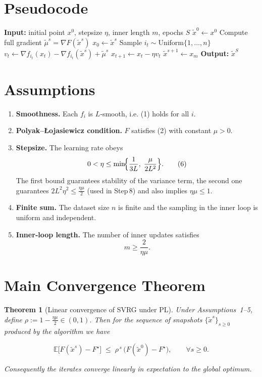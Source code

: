 \documentclass{article}
\newtheorem{theorem}{Theorem}
\newcommand{\E}{\mathbb{E}}
\begin{document}
\section*{Pseudocode}
\begin{algorithm}[H]
\caption{SVRG with PL condition}
\begin{algorithmic}[1]
\State \textbf{Input:} initial point $x^{0}$, stepsize $\eta$, inner length $m$, epochs $S$
\State $\tilde{x}^{0}\gets x^{0}$
    \State Compute full gradient $\tilde{\mu}^{s}= \nabla F(\tilde{x}^{s})$
    \State $x_{0}\gets \tilde{x}^{s}$
        \State Sample $i_t\sim\text{Uniform}\{1,\dots,n\}$
        \State $v_t \gets \nabla f_{i_t}(x_t)-\nabla f_{i_t}(\tilde{x}^{s})+\tilde{\mu}^{s}$
        \State $x_{t+1}\gets x_t-\eta v_t$
    \EndFor
    \State $\tilde{x}^{s+1}\gets x_m$
\EndFor
\State \textbf{Output:} $\tilde{x}^{S}$
\end{algorithmic}
\end{algorithm}

\section*{Assumptions}
\begin{enumerate}
\item \textbf{Smoothness.} Each $f_i$ is $L$‑smooth, i.e. (1) holds for all $i$.
\item \textbf{Polyak–\L{}ojasiewicz condition.} $F$ satisfies (2) with constant $\mu>0$.
\item \textbf{Stepsize.} The learning rate obeys  
\[
0<\eta\le \min\!\Bigl\{\frac{1}{3L},\;\frac{\mu}{2L^{2}}\Bigr\}.
\tag{6}
\]
The first bound guarantees stability of the variance term, the second one guarantees
$2L^{2}\eta^{2}\le\frac{\eta\mu}{2}$ (used in Step 8) and also implies $\eta\mu\le1$.
\item \textbf{Finite sum.} The dataset size $n$ is finite and the sampling in the inner loop is uniform and independent.
\item \textbf{Inner‑loop length.} The number of inner updates satisfies  
\[
m\ge \frac{2}{\eta\mu}.
\tag{7}
\]
\end{enumerate}

\section*{Main Convergence Theorem}
\begin{theorem}[Linear convergence of SVRG under PL]\label{thm:linear}
Under Assumptions~1–5, define $\rho:=1-\frac{\eta\mu}{2}\in(0,1)$.  
Then for the sequence of snapshots $\{\tilde{x}^{s}\}_{s\ge0}$ produced by the algorithm we have  

\[
\E\!\bigl[F(\tilde{x}^{s})-F^{\star}\bigr]\;\le\;\rho^{\,s}\,\bigl(F(\tilde{x}^{0})-F^{\star}\bigr),
\qquad\forall s\ge0.
\tag{8}
\]

Consequently the iterates converge linearly in expectation to the global optimum.
\end{theorem}
\end{document}
